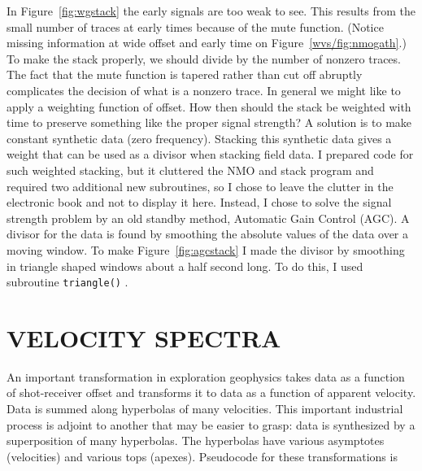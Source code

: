 In Figure~\ref{fig:wgstack} the early signals are too weak to see.
This results from the small number of traces
at early times because of the mute function.
(Notice missing information at wide offset and early time
on Figure~\ref{wvs/fig:nmogath}.)
To make the stack properly, we should divide by the number of nonzero traces.
The fact that the mute function is tapered rather than cut off abruptly
complicates the decision of what is a nonzero trace.
In general we might like to apply a weighting function of offset.
How then should the stack be weighted with time to preserve
something like the proper signal strength?
A solution is to make constant synthetic data (zero frequency).
Stacking this synthetic data gives a weight that can be used
as a divisor when stacking field data.
I prepared code for such weighted stacking,
but it cluttered the NMO and stack program and required
two additional new subroutines,
so I chose to leave the clutter in the electronic book
and not to display it here.
Instead, I chose to solve the signal strength problem
by an old standby method, Automatic Gain Control (AGC).
A divisor for the data is found by smoothing the absolute
values of the data over a moving window.
To make Figure~\ref{fig:agcstack} I made the divisor by smoothing
in triangle shaped windows about a half second long.
To do this, I used subroutine \texttt{triangle()} .


%
%
%

\section{VELOCITY SPECTRA}
An important transformation in exploration geophysics
takes data as a function of shot-receiver offset
and transforms it to data as a function of apparent velocity.
Data is summed along hyperbolas of many velocities.
This important industrial process is adjoint to another that may
be easier to grasp:  data is synthesized by a superposition
of many hyperbolas.
The hyperbolas have various asymptotes (velocities) and various
tops (apexes).
Pseudocode for these transformations is
\par\noindent

